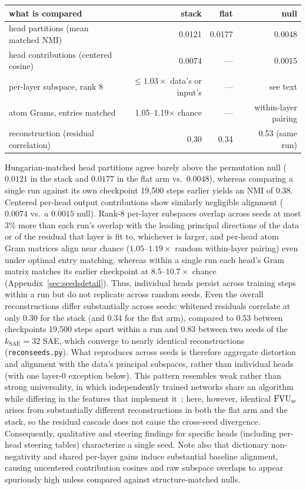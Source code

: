 \begin{center}\small\setlength{\tabcolsep}{4pt}
\begin{tabular}{@{}lrrr@{}}
\toprule
what is compared & stack & flat & null \\
\midrule
head partitions (mean matched NMI) & 0.0121 & 0.0177 & 0.0048 \\
head contributions (centered cosine) & 0.0074 & --- & 0.0015 \\
per-layer subspace, rank 8 & $\le 1.03\times$ data's or input's & --- & see text \\
atom Grams, entries matched & 1.05--1.19$\times$ chance & --- & within-layer pairing \\
reconstruction (residual correlation) & 0.30 & 0.34 & 0.53 (same run) \\
\bottomrule
\end{tabular}
\end{center}

Hungarian-matched head partitions agree barely above the permutation null
($0.0121$ in the stack and $0.0177$ in the flat arm vs.\ $0.0048$), whereas
comparing a single run against its own checkpoint 19{,}500 steps earlier
yields an NMI of $0.38$. Centered per-head output contributions show
similarly negligible alignment ($0.0074$ vs.\ a $0.0015$ null). Rank-8
per-layer subspaces overlap across seeds at most $3\%$ more than each run's
overlap with the leading principal directions of the data or of the
residual that layer is fit to, whichever is larger, and per-head atom Gram matrices
align near chance ($1.05$--$1.19\times$ random within-layer pairing) even
under optimal entry matching, whereas within a single run each head's Gram
matrix matches its earlier checkpoint at $8.5$--$10.7\times$ chance
(Appendix~\ref{sec:seedsdetail}). Thus, individual heads persist across
training steps within a run but do not replicate across random seeds. Even
the overall reconstructions differ substantially across seeds: whitened
residuals correlate at only $0.30$ for the stack (and $0.34$ for the flat
arm), compared to $0.53$ between checkpoints 19{,}500 steps apart within a
run and $0.83$ between two seeds of the $k_{\mathrm{SAE}}{=}32$ SAE, which
converge to nearly identical reconstructions (\texttt{reconseeds.py}). What
reproduces across seeds is therefore aggregate distortion and alignment with
the data's principal subspaces, rather than individual heads (with one
layer-0 exception below). This pattern resembles weak rather than strong
universality, in which independently trained networks share an algorithm
while differing in the features that implement
it~\cite{chughtai2023}; here, however, identical $\mathrm{FVU}_w$ arises from
substantially different reconstructions in both the flat arm and the
stack, so the residual cascade does not cause the cross-seed divergence. Consequently, qualitative and steering
findings for specific heads (including per-head steering tables)
characterize a single seed. Note also that dictionary
non-negativity and shared per-layer gains induce substantial baseline
alignment, causing uncentered contribution cosines and raw subspace overlaps
to appear spuriously high unless compared against structure-matched nulls.

